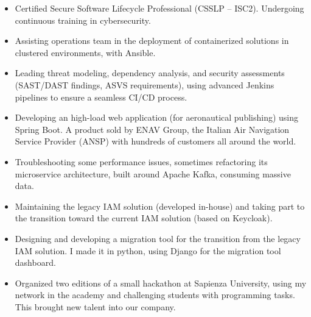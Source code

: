 	\medskip

	\begin{itemize}
		\item Certified Secure Software Lifecycle Professional (CSSLP – ISC2). Undergoing continuous training in cybersecurity.
		\item Assisting operations team in the deployment of containerized solutions in clustered environments, with Ansible.
		\item Leading threat modeling, dependency analysis, and security assessments (SAST/DAST findings, ASVS requirements), using advanced Jenkins pipelines to ensure a seamless CI/CD process.
	\end{itemize}
	\smallskip

	\medskip

	\begin{itemize}
		\item Developing an high-load web application (for aeronautical publishing) using Spring Boot. A product sold by ENAV Group, the Italian Air Navigation Service Provider (ANSP) with hundreds of customers all around the world.
		\item Troubleshooting some performance issues, sometimes refactoring its microservice architecture, built around Apache Kafka, consuming massive data.
		\item Maintaining the legacy IAM solution (developed in-house) and taking part to the transition toward the current IAM solution (based on Keycloak).
		\item Designing and developing a migration tool for the transition from the legacy IAM solution. I made it in python, using Django for the migration tool dashboard.
		\item Organized two editions of a small hackathon at Sapienza University, using my network in the academy and challenging students with programming tasks. This brought new talent into our company.
	\end{itemize}
	\smallskip

	\divider

